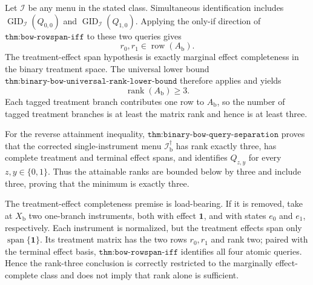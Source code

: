 Let \(\mathcal I\) be any menu in the stated class.  Simultaneous identification includes \(\operatorname{GID}_{\mathcal I}(Q_{0,0})\) and \(\operatorname{GID}_{\mathcal I}(Q_{1,0})\).  Applying the only-if direction of \(\texttt{thm:bow-rowspan-iff}\) to these two queries gives
\[
 r_0,r_1\in\operatorname{row}(A_{\mathrm b}).
\]
The treatment-effect span hypothesis is exactly marginal effect completeness in the binary treatment space.  The universal lower bound \(\texttt{thm:binary-bow-universal-rank-lower-bound}\) therefore applies and yields
\[
 \operatorname{rank}(A_{\mathrm b})\ge3.
\]
Each tagged treatment branch contributes one row to \(A_{\mathrm b}\), so the number of tagged treatment branches is at least the matrix rank and hence is at least three.

For the reverse attainment inequality, \(\texttt{thm:binary-bow-query-separation}\) proves that the corrected single-instrument menu \(\mathcal I_{\mathrm b}^{\dagger}\) has rank exactly three, has complete treatment and terminal effect spans, and identifies \(Q_{z,y}\) for every \(z,y\in\{0,1\}\).  Thus the attainable ranks are bounded below by three and include three, proving that the minimum is exactly three.

The treatment-effect completeness premise is load-bearing.  If it is removed, take at \(X_{\mathrm b}\) two one-branch instruments, both with effect \(\mathbf 1\), and with states \(e_0\) and \(e_1\), respectively.  Each instrument is normalized, but the treatment effects span only \(\operatorname{span}\{\mathbf 1\}\).  Its treatment matrix has the two rows \(r_0,r_1\) and rank two; paired with the terminal effect basis, \(\texttt{thm:bow-rowspan-iff}\) identifies all four atomic queries.  Hence the rank-three conclusion is correctly restricted to the marginally effect-complete class and does not imply that rank alone is sufficient.